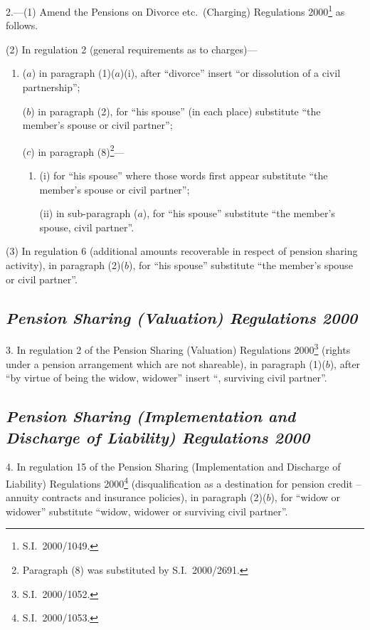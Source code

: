 \documentclass[12pt,a4paper]{article}
\begin{document}
2.---(1)  Amend the Pensions on Divorce etc.\ (Charging) Regulations 2000\footnote{S.I.\ 2000/1049.} as follows.

(2) In regulation 2 (general requirements as to charges)—
\begin{enumerate}\item[]
($a$) in paragraph (1)($a$)(i), after “divorce” insert “or dissolution of a civil partnership”;

($b$) in paragraph (2), for “his spouse” (in each place) substitute “the member’s spouse or civil partner”;

($c$) in paragraph (8)\footnote{Paragraph (8) was substituted by S.I.\ 2000/2691.}—
\begin{enumerate}\item[]
(i) for “his spouse” where those words first appear substitute “the member’s spouse or civil partner”;

(ii) in sub-paragraph ($a$), for “his spouse” substitute “the member’s spouse, civil partner”.
\end{enumerate}
\end{enumerate}

(3) In regulation 6 (additional amounts recoverable in respect of pension sharing activity), in paragraph (2)($b$), for “his spouse” substitute “the member’s spouse or civil partner”.

\subsection*{\itshape Pension Sharing (Valuation) Regulations 2000}

3.  In regulation 2 of the Pension Sharing (Valuation) Regulations 2000\footnote{S.I.\ 2000/1052.} (rights under a pension arrangement which are not shareable), in paragraph (1)($b$), after “by virtue of being the widow, widower” insert “, surviving civil partner”.

\subsection*{\itshape Pension Sharing (Implementation and Discharge of Liability) Regulations 2000}

4.  In regulation 15 of the Pension Sharing (Implementation and Discharge of Liability) Regulations 2000\footnote{S.I.\ 2000/1053.} (disqualification as a destination for pension credit – annuity contracts and insurance policies), in paragraph (2)($b$), for “widow or widower” substitute “widow, widower or surviving civil partner”.
\end{document}
